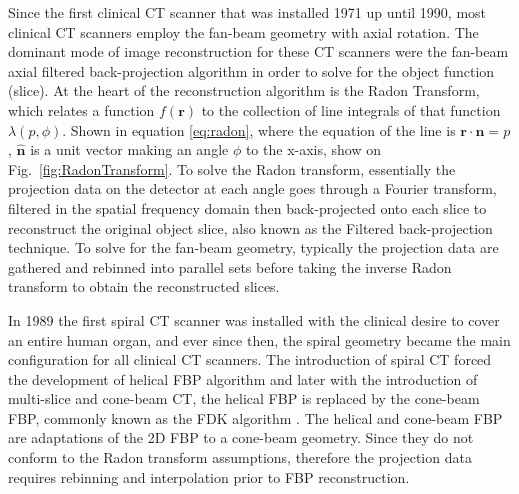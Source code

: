 Since the first clinical CT scanner that was installed 1971 up until 1990, most clinical CT scanners employ the fan-beam geometry with axial rotation.  The dominant mode of image reconstruction for these CT scanners were the fan-beam axial filtered back-projection algorithm in order to solve for the object function (slice).  At the heart of the reconstruction algorithm is the Radon Transform, which relates a function $f(\mathbf{r})$ to the collection of line integrals of that function $\lambda(p, \phi)$.  Shown in equation \ref{eq:radon}, where the equation of the line is $\mathbf{r \cdot \hat{n}} = p$, $\mathbf{\hat{n}}$ is a unit vector making an angle $\phi$ to the x-axis, show on Fig.~\ref{fig:RadonTransform}.  To solve the Radon transform, essentially the projection data on the detector at each angle goes through a Fourier transform, filtered in the spatial frequency domain then back-projected onto each slice to reconstruct the original object slice, also known as the Filtered back-projection technique.  To solve for the fan-beam geometry, typically the projection data are gathered and rebinned into parallel sets before taking the inverse Radon transform to obtain the reconstructed slices.  

In 1989 the first spiral CT scanner was installed with the clinical desire to cover an entire human organ, and ever since then, the spiral geometry became the main configuration for all clinical CT scanners.  The introduction of spiral CT forced the development of helical FBP algorithm and later with the introduction of multi-slice and cone-beam CT, the helical FBP is replaced by the cone-beam FBP, commonly known as the FDK algorithm \citep{Feldkamp1984}.  The helical and cone-beam FBP are adaptations of the 2D FBP to a cone-beam geometry.  Since they do not conform to the Radon transform assumptions, therefore the projection data requires rebinning and interpolation prior to FBP reconstruction.


